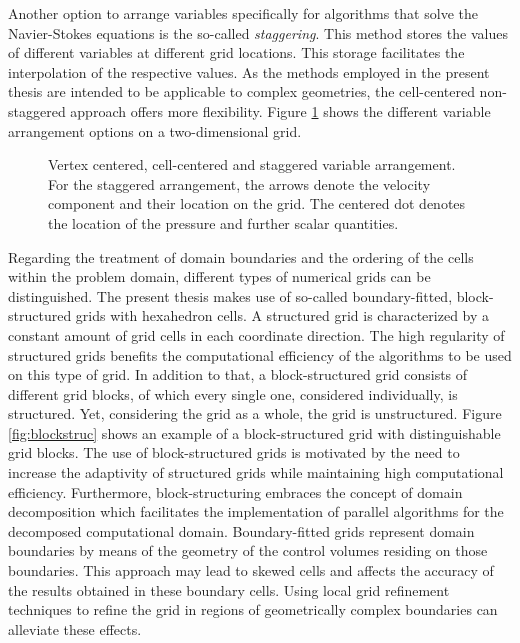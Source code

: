 Another option to arrange variables specifically for algorithms that solve the Navier-Stokes equations is the so-called \emph{staggering}. This method stores the values of different variables at different grid locations. This storage facilitates the interpolation of the respective values. As the methods employed in the present thesis are intended to be applicable to complex geometries, the cell-centered non-staggered approach offers more flexibility. Figure \ref{fig:cellvertex} shows the different variable arrangement options on a two-dimensional grid.

\begin{figure}[h!]
    \hfil
    \hfil
    \caption{Vertex centered, cell-centered and staggered variable arrangement. For the staggered arrangement, the arrows denote the velocity component and their location on the grid. The centered dot denotes the location of the pressure and further scalar quantities.}
   \label{fig:cellvertex}
\end{figure}

Regarding the treatment of domain boundaries and the ordering of the cells within the problem domain, different types of numerical grids can be distinguished. The present thesis makes use of so-called boundary-fitted, block-structured grids with hexahedron cells. A structured grid is characterized by a constant amount of grid cells in each coordinate direction. The high regularity of structured grids benefits the computational efficiency of the algorithms to be used on this type of grid. In addition to that, a block-structured grid consists of different grid blocks, of which every single one, considered individually, is structured. Yet, considering the grid as a whole, the grid is unstructured. Figure \ref{fig:blockstruc} shows an example of a block-structured grid with distinguishable grid blocks. The use of block-structured grids is motivated by the need to increase the adaptivity of structured grids while maintaining high computational efficiency. Furthermore, block-structuring embraces the concept of domain decomposition which facilitates the implementation of parallel algorithms for the decomposed computational domain. Boundary-fitted grids represent domain boundaries by means of the geometry of the control volumes residing on those boundaries. This approach may lead to skewed cells and affects the accuracy of the results obtained in these boundary cells. Using local grid refinement techniques to refine the grid in regions of geometrically complex boundaries can alleviate these effects.

